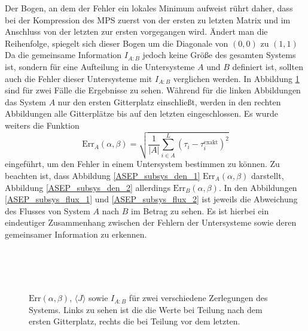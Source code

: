 \documentclass[10pt,a4paper]{report}
\begin{document}
Der Bogen, an dem der Fehler ein lokales Minimum aufweist rührt daher, dass bei der Kompression des MPS zuerst von der ersten zu letzten Matrix und im Anschluss von der letzten zur ersten vorgegangen wird. Ändert man die Reihenfolge, spiegelt sich dieser Bogen um die Diagonale von $(0,0)$ zu $(1,1)$\\

Da die gemeinsame Information $I_{A:B}$ jedoch keine Größe des gesamten Systems ist, sondern für eine Aufteilung in die Untersysteme $A$ und $B$ definiert ist, sollten auch die Fehler dieser Untersysteme mit $I_{A:B}$ verglichen werden. In Abbildung \ref{ASEP_subsys_img} sind für zwei Fälle die Ergebnisse zu sehen. Während für die linken Abbildungen das System $A$ nur den ersten Gitterplatz einschließt, werden in den rechten Abbildungen alle Gitterplätze bis auf den letzten eingeschlossen. Es wurde weiters die Funktion
\begin{equation}
\text{Err}_A(\alpha,\beta)=\sqrt{\frac{1}{\lvert A\rvert}\sum_{i\in A}^L (\tau_i-\tau_i^{\text{exakt}})^2}
\end{equation}
eingeführt, um den Fehler in einem Untersystem bestimmen zu können. Zu beachten ist, dass Abbildung \ref{ASEP_subsys_den_1} $\text{Err}_A(\alpha,\beta)$ darstellt, Abbildung \ref{ASEP_subsys_den_2} allerdings $\text{Err}_B(\alpha,\beta)$. In den Abbildungen \ref{ASEP_subsys_flux_1} und \ref{ASEP_subsys_flux_2} ist jeweils die Abweichung des Flusses von System $A$ nach $B$ im Betrag zu sehen. Es ist hierbei ein eindeutiger Zusammenhang zwischen der Fehlern der Untersysteme sowie deren gemeinsamer Information zu erkennen.\\

\begin{figure}
\centering
{}
\\
\\
\\
\caption{$\text{Err}(\alpha,\beta)$, $\langle J\rangle$ sowie $I_{A:B}$ für zwei verschiedene Zerlegungen des Systems. Links zu sehen ist die die Werte bei Teilung nach dem ersten Gitterplatz, rechts die bei Teilung vor dem letzten.}
\label{ASEP_subsys_img}
\end{figure}
\end{document}
